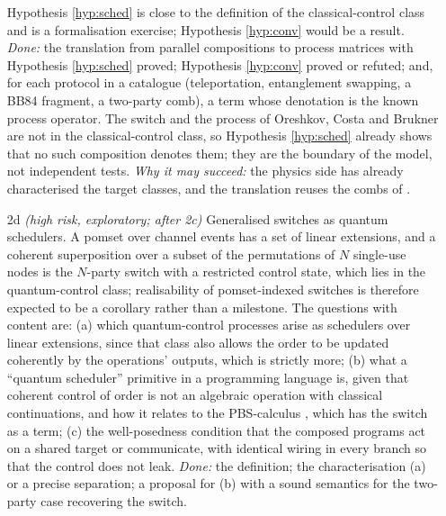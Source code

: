 \begin{itemize}[nosep]
\noindent Hypothesis \ref{hyp:sched} is close to the definition of the classical-control class and is a formalisation exercise; Hypothesis \ref{hyp:conv} would be a result. \emph{Done:} the translation from parallel compositions to process matrices with Hypothesis \ref{hyp:sched} proved; Hypothesis \ref{hyp:conv} proved or refuted; and, for each protocol in a catalogue (teleportation, entanglement swapping, a BB84 fragment, a two-party comb), a term whose denotation is the known process operator. The switch and the process of Oreshkov, Costa and Brukner are not in the classical-control class, so Hypothesis \ref{hyp:sched} already shows that no such composition denotes them; they are the boundary of the model, not independent tests.  \emph{Why it may succeed:} the physics side has already characterised the target classes, and the translation reuses the combs of .
\item[2d] \textit{(high risk, exploratory; after 2c)} Generalised switches as quantum schedulers. A pomset over channel events has a set of linear extensions, and a coherent superposition over a subset of the permutations of $N$ single-use nodes is the $N$-party switch with a restricted control state, which lies in the quantum-control class; realisability of pomset-indexed switches is therefore expected to be a corollary rather than a milestone. The questions with content are: (a) which quantum-control processes arise as schedulers over linear extensions, since that class also allows the order to be updated coherently by the operations' outputs, which is strictly more; (b) what a ``quantum scheduler'' primitive in a programming language is, given that coherent control of order is not an algebraic operation with classical continuations, and how it relates to the PBS-calculus \cite{clement2020pbs}, which has the switch as a term; (c) the well-posedness condition that the composed programs act on a shared target or communicate, with identical wiring in every branch so that the control does not leak. \emph{Done:} the definition; the characterisation (a) or a precise separation; a proposal for (b) with a sound semantics for the two-party case recovering the switch.
\end{itemize}

